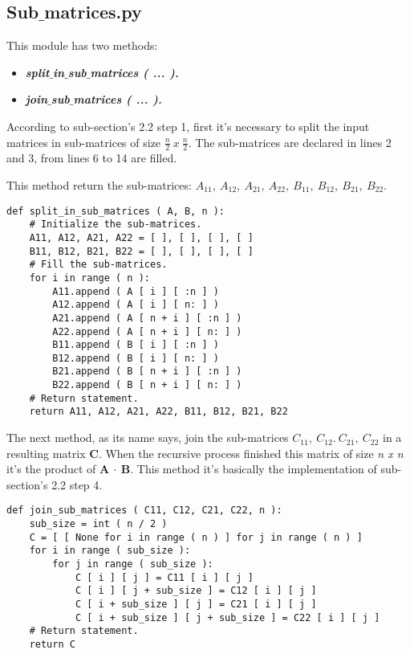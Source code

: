 \subsection{Sub$\_$matrices.py}

This module has two methods:

\begin{itemize}
\item {\bfseries\itshape split$\_$in$\_$sub$\_$matrices ( ... ).}
\item {\bfseries\itshape join$\_$sub$\_$matrices ( ... ).}
\end{itemize} 

According to sub-section's 2.2 step 1, first it's necessary to split the input matrices in sub-matrices of size $\frac{n}{2}\ x\ \frac{n}{2}$. The sub-matrices are declared in lines 2 and 3, from lines 6 to 14 are filled. \hfill \break

This method return the sub-matrices: $A_{11},\ A_{12},\ A_{21},\ A_{22},\ B_{11},\ B_{12},\ B_{21},\ B_{22}$. \hfill \break

\begin{lstlisting}
def split_in_sub_matrices ( A, B, n ):
    # Initialize the sub-matrices.
    A11, A12, A21, A22 = [ ], [ ], [ ], [ ]
    B11, B12, B21, B22 = [ ], [ ], [ ], [ ]
    # Fill the sub-matrices.
    for i in range ( n ):
        A11.append ( A [ i ] [ :n ] )
        A12.append ( A [ i ] [ n: ] )
        A21.append ( A [ n + i ] [ :n ] )
        A22.append ( A [ n + i ] [ n: ] )
        B11.append ( B [ i ] [ :n ] )
        B12.append ( B [ i ] [ n: ] )
        B21.append ( B [ n + i ] [ :n ] )
        B22.append ( B [ n + i ] [ n: ] )
    # Return statement.
    return A11, A12, A21, A22, B11, B12, B21, B22
\end{lstlisting} \hfill 

The next method, as its name says, join the sub-matrices {\bfseries $C_{11},\ C_{12}.\ C_{21},\ C_{22}$} in a resulting matrix {\bfseries C}. When the recursive process finished this matrix of size {\itshape n x n} it's the product of {\bfseries A $\cdot$ B}. This method it's basically the implementation of sub-section's 2.2 step 4. \hfill \break

\begin{lstlisting}
def join_sub_matrices ( C11, C12, C21, C22, n ):
    sub_size = int ( n / 2 )
    C = [ [ None for i in range ( n ) ] for j in range ( n ) ]
    for i in range ( sub_size ):
        for j in range ( sub_size ):
            C [ i ] [ j ] = C11 [ i ] [ j ]
            C [ i ] [ j + sub_size ] = C12 [ i ] [ j ]
            C [ i + sub_size ] [ j ] = C21 [ i ] [ j ]
            C [ i + sub_size ] [ j + sub_size ] = C22 [ i ] [ j ]
    # Return statement.
    return C
\end{lstlisting} \hfill

{\bfseries\itshape\color{carmine}{Observation:}} {\itshape{}} 

\pagebreak
